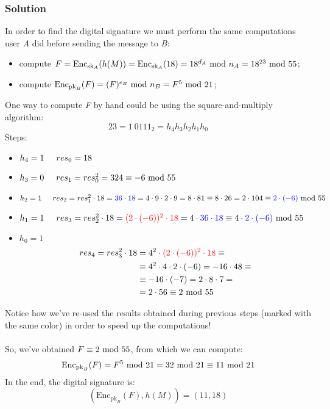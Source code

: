 \subsubsection*{Solution}
In order to find the digital signature we must perform the same computations user \textit{A} did before sending the message to \textit{B}:
\begin{itemize}
    \item compute $F = \text{Enc}_{\text{sk}_A}(h(M))=\text{Enc}_{\text{sk}_A}(18)=18^{d_A}\text{ mod } n_A=18^{23}\text{ mod }55$;
    \item compute $\text{Enc}_{\text{pk}_B}(F)=(F)^{e_B}\text{ mod } n_B=F^5\text{ mod }21$;
\end{itemize}
One  way to compute \textit{F} by hand could be using the square-and-multiply algorithm:
$$23=1\ 0111_2=h_4h_3h_2h_1h_0$$
Steps:
\begin{itemize}
    \item $h_4=1\hspace{0.5cm}res_0=18$
    \item $h_3=0\hspace{0.5cm}res_1=res_0^2=324\equiv-6\text{ mod }55$
    \item $h_2=1\hspace{0.5cm}res_2=res_1^2\cdot18=\textcolor{blue}{36\cdot18}=4\cdot9\cdot2\cdot9=8\cdot81\equiv8\cdot26=2\cdot104\equiv\textcolor{blue}{2\cdot(-6)}\text{ mod }55$
    \item $h_1=1\hspace{0.5cm}res_3=res_2^2\cdot18=\textcolor{red}{(2\cdot(-6))^2\cdot18}=4\cdot\textcolor{blue}{36\cdot18}\equiv4\cdot\textcolor{blue}{2\cdot(-6)}\text{ mod }55$
    \item $h_0=1$
    \begin{align*}
        res_4=res_3^2\cdot18&=4^2\cdot\textcolor{red}{(2\cdot(-6))^2\cdot18}\equiv\\
        &\equiv4^2\cdot4\cdot2\cdot(-6)=-16\cdot48\equiv\\
        &\equiv-16\cdot(-7)=2\cdot8\cdot7=\\
        &=2\cdot56\equiv2\text{ mod }55
    \end{align*}
\end{itemize}
Notice how we've re-used the results obtained during previous steps (marked with the same color) in order to speed up the computations!\\\\
So, we've obtained $F\equiv2\text{ mod }55$, from which we can compute:
$$\text{Enc}_{\text{pk}_B}(F)=F^5\text{ mod }21=32\text{ mod }21\equiv11\text{ mod }21$$
In the end, the digital signature is:
$$(\text{Enc}_{\text{pk}_B}(F),h(M))=(11,18)$$


